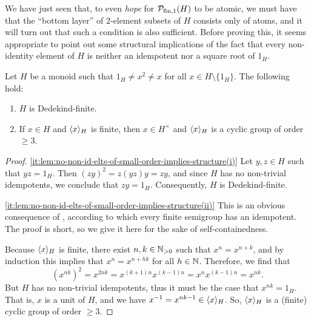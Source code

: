 %
We have just seen that, to even {\it hope} for $\mathcal{P}_{\textrm{fin}, 1}(H)$ to be atomic, we must have that the ``bottom layer'' of $2$-element subsets of $H$ consists only of atoms, and it will turn out that such a condition is also sufficient.
Before proving this, it seems appropriate to point out some structural implications of the fact that every non-identity element of $H$ is neither an idempotent nor a square root of $1_H$.
%
\begin{lemma}\label{lem:no-non-id-elts-of-small-order-implies-structure}
	Let $H$ be a monoid such that $1_H \ne x^2 \ne x$ for all $x\in H\setminus\{1_H\}$. The following hold:
	\begin{enumerate}[label={\rm (\roman{*})}]
		\item\label{it:lem:no-non-id-elts-of-small-order-implies-structure(i)}
		$H$ is Dedekind-finite.
		\item\label{it:lem:no-non-id-elts-of-small-order-implies-structure(ii)}
		If $x \in H$ and $\langle x \rangle_H$ is finite, then $x \in H^\times$ and $\langle x \rangle_H$ is a cyclic group of order $\ge 3$.
	\end{enumerate}
\end{lemma}
%
\begin{proof}
	\ref{it:lem:no-non-id-elts-of-small-order-implies-structure(i)}
	Let $y,z\in H$ such that $yz = 1_H$. Then $(zy)^2 = z(yz)y = zy$, and since $H$ has no non-trivial i\-dem\-po\-tents, we conclude that $zy=1_H$. Consequently, $H$ is Dedekind-finite.
	
	\ref{it:lem:no-non-id-elts-of-small-order-implies-structure(ii)}
	This is an obvious consequence of \cite[Ch. V, Exercise 4, p. 68]{Whitelaw}, according to which every finite semigroup has an idempotent.
	The proof is short, so we give it here for the sake of self-containedness.
	
	Because $\langle x \rangle_H$ is finite, there exist $n, k \in \mathbb{N}_{>0}$ such that $x^n = x^{n+k}$, and by induction this implies that $x^n = x^{n+hk}$ for all $h \in \mathbb{N}$. Therefore, we find that
	\[
	(x^{nk})^2 = x^{2nk} = x^{(k+1)n}x^{(k-1)n} = x^n x^{(k-1)n} = x^{nk}.
	\]
	But $H$ has no non-trivial idempotents, thus it must be the case that $x^{nk}=1_H$. That is, $x$ is a unit of $H$, and we have $x^{-1} = x^{nk-1} \in \langle x \rangle_H$. So, $\langle x \rangle_H$ is a (finite) cyclic group of order $\ge 3$.
\end{proof}

%

